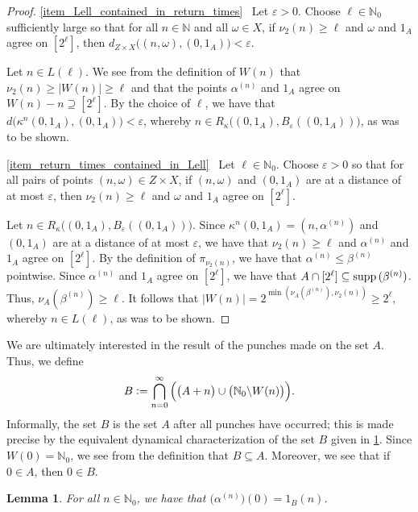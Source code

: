 \documentclass[letter,11pt]{article}
\theoremstyle{plain}
\newtheorem{lemma}[theorem]{Lemma}
\theoremstyle{definition}
\theoremstyle{plain}
\theoremstyle{plain}
\numberwithin{equation}{section}
\newcommand{\supp}{{\normalfont\text{supp}}\,}
\newcommand{\eps}{\epsilon}
\newcommand{\N}{\mathbb{N}}
\newcommand{\defeq}{\vcentcolon=}
\renewcommand{\epsilon}{\varepsilon}
\renewcommand{\leq}{\leqslant}
\renewcommand{\geq}{\geqslant}
\renewcommand{\setminus}{\backslash}
\newcommand{\odometer}{Z}
\newcommand{\bpunch}{\beta}
\newcommand{\apunch}{\alpha}
\begin{document}
\begin{proof}
    \eqref{item_Lell_contained_in_return_times} \
    Let $\eps > 0$.  Choose $\ell \in \N_0$ sufficiently large so that for all $n \in \N$ and all $\omega \in X$, if $\nu_2(n) \geq \ell$ and $\omega$ and $1_A$ agree on $[2^\ell]$, then $d_{\odometer \times X}\big( (n,\omega), (0, 1_A) \big) < \eps$.

    Let $n \in L(\ell)$.  We see from the definition of $W(n)$ that $\nu_2(n) \geq |W(n)| \geq \ell$ and that the points $\apunch^{(n)}$ and $1_A$ agree on $W(n) - n \supseteq [2^\ell]$.  By the choice of $\ell$, we have that $d\big( \kappa^n (0,1_A), (0, 1_A)\big) < \eps$, whereby $n \in R_{\kappa}\big((0,1_A),B_{\eps}((0,1_A))\big)$, as was to be shown.

    \eqref{item_return_times_contained_in_Lell} \
    Let $\ell \in \N_0$.  Choose $\eps > 0$ so that for all pairs of points $(n,\omega) \in \odometer \times X$, if $(n,\omega)$ and $(0,1_A)$ are at a distance of at most $\eps$, then $\nu_2(n) \geq \ell$ and $\omega$ and $1_A$ agree on $[2^{\ell}]$.

    Let $n \in R_{\kappa}\big((0,1_A),B_{\eps}((0,1_A))\big)$.  Since $\kappa^n(0,1_A) = (n, \apunch^{(n)})$ and $(0,1_A)$ are at a distance of at most $\eps$, we have that $\nu_2(n) \geq \ell$ and $\apunch^{(n)}$ and $1_A$ agree on $[2^{\ell}]$. By the definition of $\pi_{\nu_2(n)}$, we have that $\apunch^{(n)} \leq \bpunch^{(n)}$ pointwise.  Since $\apunch^{(n)}$ and $1_A$ agree on $[2^{\ell}]$, we have that $A \cap [2^\ell] \subseteq \supp(\bpunch^{(n)})$.  Thus, $\nu_A(\bpunch^{(n)}) \geq \ell$. It follows that $|W(n)| = 2^{\min(\nu_A(\bpunch^{(n)}),\nu_2(n))} \geq 2^{\ell}$, whereby $n \in L(\ell)$, as was to be shown.
\end{proof}

We are ultimately interested in the result of the punches made on the set $A$.  Thus, we define
\begin{align}
\label{eqn_result_of_set_after_punches}
    B \defeq \bigcap_{n=0}^\infty \Big( \big( A + n \big) \cup \big(\N_0 \setminus W(n) \big) \Big).
\end{align}
Informally, the set $B$ is the set $A$ after all punches have occurred; this is made precise by the equivalent dynamical characterization of the set $B$ given in \cref{lemma_dynamical_description_of_B}. Since $W(0) = \N_0$, we see from the definition that $B \subseteq A$.  Moreover, we see that if $0 \in A$, then $0 \in B$.

\begin{lemma}
\label{lemma_dynamical_description_of_B}
    For all $n \in \N_0$, we have that $\big(\apunch^{(n)}\big)(0) = 1_B(n)$.
\end{lemma}
\end{document}
